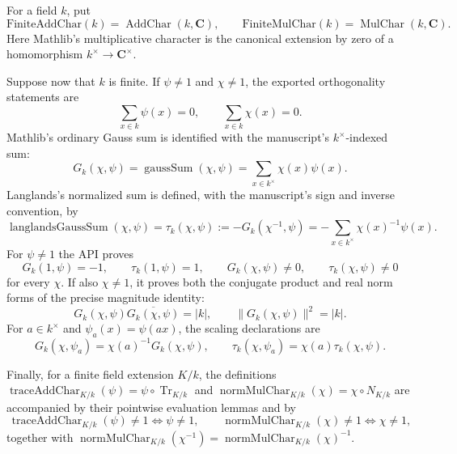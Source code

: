 \begin{definition}\label{mod:finitefield-characterapi}
For a field $k$, put
\[
 \mathrm{FiniteAddChar}(k)=\operatorname{AddChar}(k,\mathbf C),
 \qquad
 \mathrm{FiniteMulChar}(k)=\operatorname{MulChar}(k,\mathbf C).
\]
Here Mathlib's multiplicative character is the canonical extension by zero
of a homomorphism $k^\times\to\mathbf C^\times$.

Suppose now that $k$ is finite.  If $\psi\neq1$ and $\chi\neq1$, the
exported orthogonality statements are
\[
 \sum_{x\in k}\psi(x)=0,
 \qquad
 \sum_{x\in k}\chi(x)=0.
\]
Mathlib's ordinary Gauss sum is identified with the manuscript's
$k^\times$-indexed sum:
\[
 G_k(\chi,\psi)=\operatorname{gaussSum}(\chi,\psi)
 =\sum_{x\in k^\times}\chi(x)\psi(x).
\]
Langlands's normalized sum is defined, with the manuscript's sign and
inverse convention, by
\[
 \operatorname{langlandsGaussSum}(\chi,\psi)
 =\tau_k(\chi,\psi)
 :=-G_k(\chi^{-1},\psi)
 =-\sum_{x\in k^\times}\chi(x)^{-1}\psi(x).
\]
For $\psi\neq1$ the API proves
\[
 G_k(1,\psi)=-1,
 \qquad \tau_k(1,\psi)=1,
 \qquad G_k(\chi,\psi)\neq0,
 \qquad \tau_k(\chi,\psi)\neq0
\]
for every $\chi$.  If also $\chi\neq1$, it proves both the conjugate
product and real norm forms of the precise magnitude identity:
\[
 G_k(\chi,\psi)\overline{G_k(\chi,\psi)}=|k|,
 \qquad \lVert G_k(\chi,\psi)\rVert^2=|k|.
\]
For $a\in k^\times$ and $\psi_a(x)=\psi(ax)$, the scaling declarations
are
\[
 G_k(\chi,\psi_a)=\chi(a)^{-1}G_k(\chi,\psi),
 \qquad
 \tau_k(\chi,\psi_a)=\chi(a)\tau_k(\chi,\psi).
\]

Finally, for a finite field extension $K/k$, the definitions
$\operatorname{traceAddChar}_{K/k}(\psi)=\psi\circ\operatorname{Tr}_{K/k}$
and
$\operatorname{normMulChar}_{K/k}(\chi)=\chi\circ N_{K/k}$ are accompanied
by their pointwise evaluation lemmas and by
\[
 \operatorname{traceAddChar}_{K/k}(\psi)\neq1\iff\psi\neq1,
 \qquad
 \operatorname{normMulChar}_{K/k}(\chi)\neq1\iff\chi\neq1,
\]
together with
$\operatorname{normMulChar}_{K/k}(\chi^{-1})
 =\operatorname{normMulChar}_{K/k}(\chi)^{-1}$.
\leanok
{}
\FormalizationContract
\end{definition}
